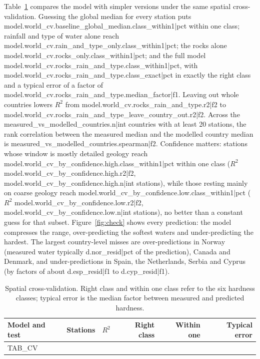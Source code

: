 \documentclass[11pt,a4paper]{article}
\begin{document}
Table~\ref{tab:cv} compares the model with simpler versions under the same spatial cross-validation. Guessing the global median for every station puts {{model.world_cv.baseline_global_median.class_within1|pct}} within one class; rainfall and type of water alone reach {{model.world_cv.rain_and_type_only.class_within1|pct}}; the rocks alone {{model.world_cv.rocks_only.class_within1|pct}}; and the full model {{model.world_cv.rocks_rain_and_type.class_within1|pct}}, with {{model.world_cv.rocks_rain_and_type.class_exact|pct}} in exactly the right class and a typical error of a factor of {{model.world_cv.rocks_rain_and_type.median_factor|f1}}. Leaving out whole countries lowers $R^2$ from {{model.world_cv.rocks_rain_and_type.r2|f2}} to {{model.world_cv.rocks_rain_and_type_leave_country_out.r2|f2}}. Across the {{measured_vs_modelled_countries.n|int}} countries with at least 20 stations, the rank correlation between the measured median and the modelled country median is {{measured_vs_modelled_countries.spearman|f2}}. Confidence matters: stations whose window is mostly detailed geology reach {{model.world_cv_by_confidence.high.class_within1|pct}} within one class ($R^2$ {{model.world_cv_by_confidence.high.r2|f2}}, {{model.world_cv_by_confidence.high.n|int}} stations), while those resting mainly on coarse geology reach {{model.world_cv_by_confidence.low.class_within1|pct}} ($R^2$ {{model.world_cv_by_confidence.low.r2|f2}}, {{model.world_cv_by_confidence.low.n|int}} stations), no better than a constant guess for that subset. Figure~\ref{fig:check} shows every prediction: the model compresses the range, over-predicting the softest waters and under-predicting the hardest. The largest country-level misses are over-predictions in Norway (measured water typically {{d.nor_resid|pct}} of the prediction), Canada and Denmark, and under-predictions in Spain, the Netherlands, Serbia and Cyprus (by factors of about {{d.esp_resid|f1}} to {{d.cyp_resid|f1}}).

\begin{table}[!htbp]
\centering
\small
\caption{Spatial cross-validation. Right class and within one class refer to the six hardness classes; typical error is the median factor between measured and predicted hardness.}
\label{tab:cv}
\begin{tabular}{lrrrrr}
\toprule
Model and test & Stations & $R^2$ & Right class & Within one & Typical error\\
\midrule
{{TAB_CV}}
\bottomrule
\end{tabular}
\end{table}
\end{document}
